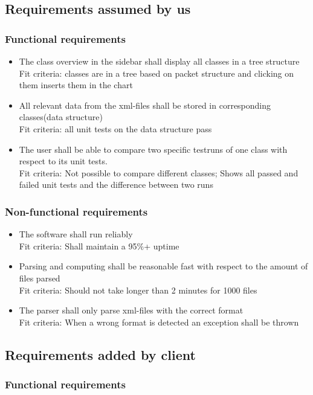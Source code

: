 \subsection{Requirements assumed by us}
\subsubsection{Functional requirements}
\begin{itemize}
	\item The class overview in the sidebar shall display all classes in a tree structure\\
	Fit criteria: classes are in a tree based on packet structure and clicking on them inserts them in the chart
	\item All relevant data from the xml-files shall be stored in corresponding classes(data structure)\\
	Fit criteria: all unit tests on the data structure pass
	\item The user shall be able to compare two specific testruns of one class with respect to its unit tests.\\
	Fit criteria: Not possible to compare different classes; Shows all passed and failed unit tests and the difference between two runs
\end{itemize}

\subsubsection{Non-functional requirements}
\begin{itemize}
	\item The software shall run reliably\\
	Fit criteria: Shall maintain a 95\%+ uptime
	\item Parsing and computing shall be reasonable fast with respect to the amount of files parsed\\
	Fit criteria: Should not take longer than 2 minutes for 1000 files
	\item The parser shall only parse xml-files with the correct format\\
	Fit criteria: When a wrong format is detected an exception shall be thrown
\end{itemize}
\subsection{Requirements added by client}
\subsubsection{Functional requirements}

